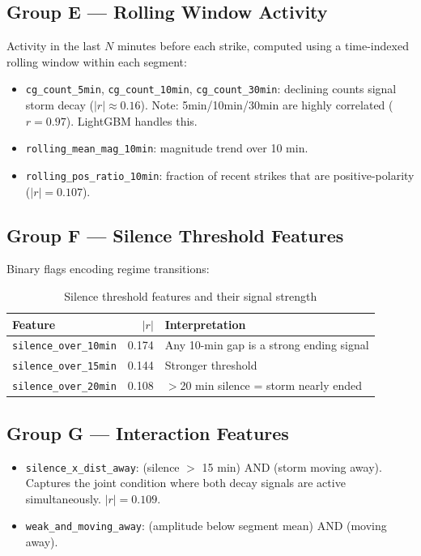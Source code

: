 \documentclass[12pt,a4paper]{article}
\begin{document}
\subsection{Group E — Rolling Window Activity}

Activity in the last $N$ minutes before each strike, computed using a time-indexed
rolling window within each segment:

\begin{itemize}[leftmargin=1.5em]
  \item \texttt{cg\_count\_5min}, \texttt{cg\_count\_10min}, \texttt{cg\_count\_30min}:
        declining counts signal storm decay ($|r| \approx 0.16$).
        Note: 5min/10min/30min are highly correlated ($r=0.97$). LightGBM handles this.
  \item \texttt{rolling\_mean\_mag\_10min}: magnitude trend over 10 min.
  \item \texttt{rolling\_pos\_ratio\_10min}: fraction of recent strikes that are
        positive-polarity ($|r|=0.107$).
\end{itemize}

\subsection{Group F — Silence Threshold Features}

Binary flags encoding regime transitions:

\begin{table}[H]
\centering
\caption{Silence threshold features and their signal strength}
\begin{tabular}{lrl}
\toprule
\textbf{Feature} & $|r|$ & \textbf{Interpretation} \\
\midrule
\texttt{silence\_over\_10min} & 0.174 & Any 10-min gap is a strong ending signal \\
\texttt{silence\_over\_15min} & 0.144 & Stronger threshold \\
\texttt{silence\_over\_20min} & 0.108 & $>$20 min silence = storm nearly ended \\
\bottomrule
\end{tabular}
\end{table}

\subsection{Group G — Interaction Features}

\begin{itemize}[leftmargin=1.5em]
  \item \texttt{silence\_x\_dist\_away}: (silence $>$ 15 min) AND (storm moving away).
        Captures the joint condition where both decay signals are active simultaneously.
        $|r|=0.109$.
  \item \texttt{weak\_and\_moving\_away}: (amplitude below segment mean) AND (moving away).
\end{itemize}
\end{document}
